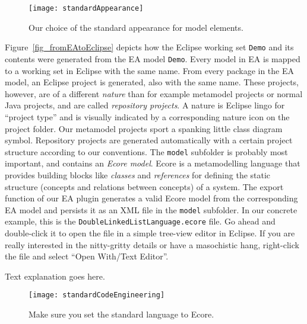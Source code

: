 \begin{enumerate}
\begin{figure}[htbp]
  \centering
  \texttt{[image: standardAppearance]}
  \caption{Our choice of the standard appearance for model elements.}
  \label{fig_standardAppearanceEA}
\end{figure}


Figure~\ref{fig_fromEAtoEclipse} depicts how the Eclipse working set \texttt{Demo} and its contents were generated from the EA model \texttt{Demo}.
Every model in EA is mapped to a working set in Eclipse with the same name. 
From every package in the EA model, an Eclipse project is generated, also with the same name.
These projects, however, are of a different \emph{nature} than for example metamodel projects or normal Java projects, and are called \emph{repository projects}.  
A nature is Eclipse lingo for ``project type'' and is visually indicated by a corresponding nature icon on the project folder.
Our  metamodel projects sport a spanking little class diagram symbol. 
Repository projects are generated automatically  with a certain project structure according to our conventions.  
The  \texttt{model} subfolder is probably most important, and contains an  \emph{Ecore model}.  
Ecore is a metamodelling language that provides building  blocks like \emph{classes} and \emph{references} for defining the  static structure (concepts and relations between concepts) of a system.  
The  export function of our EA plugin generates a valid Ecore model from the  corresponding EA model and persists it as an XML file in the \texttt{model}  subfolder.  
In our concrete example, this is the \texttt{DoubleLinkedListLanguage.ecore} file.  
Go ahead and double-click it to open the file in a simple tree-view editor in Eclipse.  
If you are really interested in the nitty-gritty details or have a masochistic hang, right-click the file and select ``Open With/Text Editor''. 

\newpage
\texHeader
Text explanation goes here.
\pagebreak

\visHeader

\begin{figure}[htbp]
  \centering
  \texttt{[image: standardCodeEngineering]}
  \caption{Make sure you set the standard language to Ecore.}
  \label{fig_standardSCEEA}
\end{figure}



\end{enumerate}
